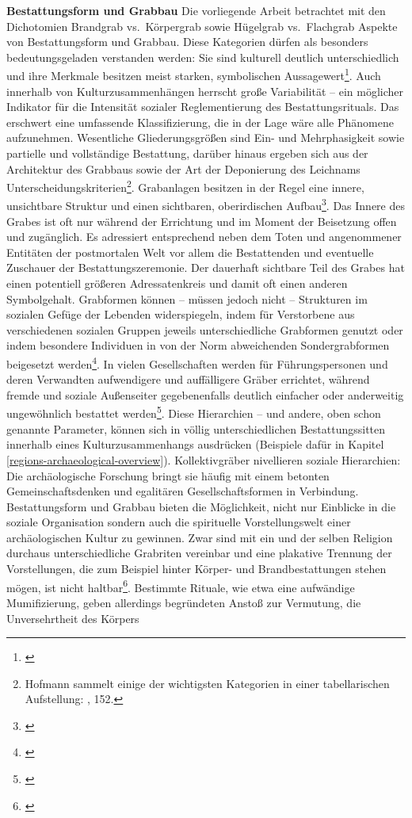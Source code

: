 \documentclass[openany,twoside,twocolumn]{book}
\let\rmarkdownfootnote\footnote%
\def\footnote{\protect\rmarkdownfootnote}
\begin{document}
\textbf{Bestattungsform und Grabbau} \newline 
Die vorliegende Arbeit betrachtet mit den Dichotomien Brandgrab vs.~Körpergrab sowie Hügelgrab vs.~Flachgrab Aspekte von Bestattungsform und Grabbau. Diese Kategorien dürfen als besonders bedeutungsgeladen verstanden werden: Sie sind kulturell deutlich unterschiedlich und ihre Merkmale besitzen meist starken, symbolischen Aussagewert\footnote{\textcite{kaliff_grave_1998}}. Auch innerhalb von Kulturzusammenhängen herrscht große Variabilität -- ein möglicher Indikator für die Intensität sozialer Reglementierung des Bestattungsrituals. Das erschwert eine umfassende Klassifizierung, die in der Lage wäre alle Phänomene aufzunehmen. Wesentliche Gliederungsgrößen sind Ein- und Mehrphasigkeit sowie partielle und vollständige Bestattung, darüber hinaus ergeben sich aus der Architektur des Grabbaus sowie der Art der Deponierung des Leichnams Unterscheidungskriterien\footnote{Hofmann sammelt einige der wichtigsten Kategorien in einer tabellarischen Aufstellung: \textcite{hofmann_rituelle_2008}, 152.}. Grabanlagen besitzen in der Regel eine innere, unsichtbare Struktur und einen sichtbaren, oberirdischen Aufbau\footnote{\textcite{skjoldebrand_variations_1995}}. Das Innere des Grabes ist oft nur während der Errichtung und im Moment der Beisetzung offen und zugänglich. Es adressiert entsprechend neben dem Toten und angenommener Entitäten der postmortalen Welt vor allem die Bestattenden und eventuelle Zuschauer der Bestattungszeremonie. Der dauerhaft sichtbare Teil des Grabes hat einen potentiell größeren Adressatenkreis und damit oft einen anderen Symbolgehalt. Grabformen können -- müssen jedoch nicht -- Strukturen im sozialen Gefüge der Lebenden widerspiegeln, indem für Verstorbene aus verschiedenen sozialen Gruppen jeweils unterschiedliche Grabformen genutzt oder indem besondere Individuen in von der Norm abweichenden Sondergrabformen beigesetzt werden\footnote{\textcite{hodder_social_1980}}. In vielen Gesellschaften werden für Führungspersonen und deren Verwandten aufwendigere und auffälligere Gräber errichtet, während fremde und soziale Außenseiter gegebenenfalls deutlich einfacher oder anderweitig ungewöhnlich bestattet werden\footnote{\textcite{pauli_ungewohnliche_1978}}. Diese Hierarchien -- und andere, oben schon genannte Parameter, können sich in völlig unterschiedlichen Bestattungssitten innerhalb eines Kulturzusammenhangs ausdrücken (Beispiele dafür in Kapitel \ref{regions-archaeological-overview}). Kollektivgräber nivellieren soziale Hierarchien: Die archäologische Forschung bringt sie häufig mit einem betonten Gemeinschaftsdenken und egalitären Gesellschaftsformen in Verbindung. Bestattungsform und Grabbau bieten die Möglichkeit, nicht nur Einblicke in die soziale Organisation sondern auch die spirituelle Vorstellungswelt einer archäologischen Kultur zu gewinnen. Zwar sind mit ein und der selben Religion durchaus unterschiedliche Grabriten vereinbar und eine plakative Trennung der Vorstellungen, die zum Beispiel hinter Körper- und Brandbestattungen stehen mögen, ist nicht haltbar\footnote{\textcite{portmann_sterben_1993}}. Bestimmte Rituale, wie etwa eine aufwändige Mumifizierung, geben allerdings begründeten Anstoß zur Vermutung, die Unversehrtheit des Körpers 
\end{document}

